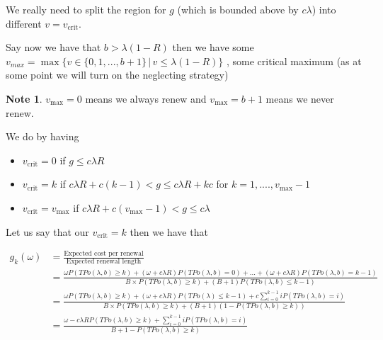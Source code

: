 \documentclass[a4paper,10pt]{article}
\theoremstyle{definition}
\theoremstyle{definition}
\theoremstyle{remark}
\theoremstyle{definition}
\newtheorem*{note}{Note}
\begin{document}
We really need to split the region for $g$ (which is bounded above by $c \lambda$) into different $v=v_{\text{crit}}$.

Say now we have that $b > \lambda (1-R) $ then we have some $v_{max}=\max \{ v \in \{ 0,1,...,b+1 \} \, | \, v \leq \lambda (1-R) \}$ , some critical maximum (as at some point we will turn on the neglecting strategy)

\begin{note}
$v_{\text{max}}=0$ means we always renew and $v_{\text{max}}=b+1$ means we never renew.
\end{note}

We do by having
\begin{itemize}
\item $v_{\text{crit}}=0$ if $g \leq c \lambda R$
\item $v_{\text{crit}}=k$ if $c \lambda R +c(k-1) < g \leq c \lambda R + kc$ for $k=1,....,v_{\text{max}}-1$
\item $v_{\text{crit}}=v_{\text{max}}$ if $c \lambda R + c(v_{\text{max}}-1) < g \leq c \lambda$
\end{itemize}

Let us say that our $v_{\text{crit}}=k$ then we have that

\begin{align*}
g_{k}(\omega)&=\frac{\text{Expected cost per renewal}}{\text{Expected renewal length}} \\
&= \frac{\omega P(TPo(\lambda,b) \geq k) + (\omega + c \lambda R) P(TPo(\lambda,b)=0)+...+(\omega + c \lambda R) P(TPo(\lambda,b)=k-1)}{B \times P(TPo(\lambda,b) \geq k) + (B+1)P(TPo(\lambda,b) \leq k-1)} \\
&=\frac{\omega P(TPo(\lambda,b) \geq k) + (\omega + c \lambda R )P(TPo(\lambda) \leq k-1) + c \sum\limits_{i=0}^{k-1} i P(TPo(\lambda,b)=i)}{B \times P(TPo(\lambda,b) \geq k) + (B+1)(1-P(TPo(\lambda,b) \geq k))} \\
&= \frac{\omega - c \lambda R P(TPo(\lambda,b) \geq k) +  \sum\limits_{i=0}^{k-1} i P(TPo(\lambda,b)=i)}{B+1-P(TPo(\lambda,b) \geq k)}
\end{align*}

\begin{myfigure}
\begin{center}
\resizebox{.6\textwidth}{!}{
}
\end{center}
\caption{This shows the best long-run average cost (as a choice of $k$ for each $\omega$) Note. Figure needs checking against new formula (using B instead of floor(B)}
\end{myfigure}
\end{document}
